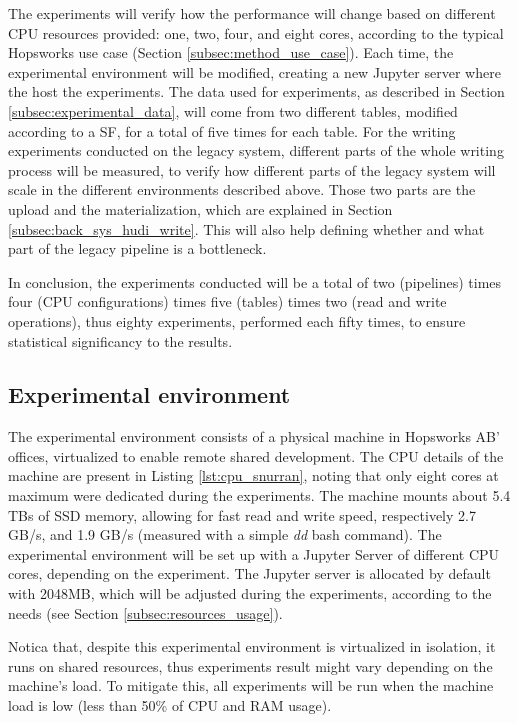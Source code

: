 The experiments will verify how the performance will change based on different \gls{CPU} resources provided: one, two, four, and eight cores, according to the typical Hopsworks use case (Section \ref{subsec:method_use_case}). Each time, the experimental environment will be modified, creating a new Jupyter server where the host the experiments. The data used for experiments, as described in Section \ref{subsec:experimental_data}, will come from two different tables, modified according to a \gls{SF}, for a total of five times for each table. For the writing experiments conducted on the legacy system, different parts of the whole writing process will be measured, to verify how different parts of the legacy system will scale in the different environments described above. Those two parts are the upload and the materialization, which are explained in Section \ref{subsec:back_sys_hudi_write}. This will also help defining whether and what part of the legacy pipeline is a bottleneck.

In conclusion, the experiments conducted will be a total of two (pipelines) times four (\gls{CPU} configurations) times five (tables) times two (read and write operations), thus eighty experiments, performed each fifty times, to ensure statistical significancy to the results.



\subsection{Experimental environment}
\label{subsec:experimental_env}

The experimental environment consists of a physical machine in Hopsworks AB' offices, virtualized to enable remote shared development. The \gls{CPU} details of the machine are present in Listing \ref{lst:cpu_snurran}, noting that only eight cores at maximum were dedicated during the experiments. The machine mounts about 5.4 TBs of \gls{SSD} memory, allowing for fast read and write speed, respectively 2.7 GB/s, and 1.9 GB/s (measured with a simple \textit{dd} bash command). The experimental environment will be set up with a Jupyter Server of different CPU cores, depending on the experiment. The Jupyter server is allocated by default with 2048MB, which will be adjusted during the experiments, according to the needs (see Section \ref{subsec:resources_usage}).

Notica that, despite this experimental environment is virtualized in isolation, it runs on shared resources, thus experiments result might vary depending on the machine's load. To mitigate this, all experiments will be run when the machine load is low (less than 50\% of \gls{CPU} and \gls{RAM} usage).

